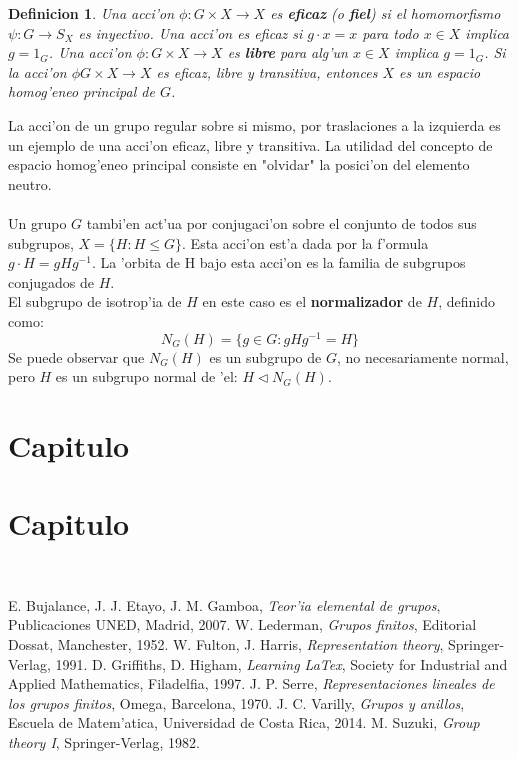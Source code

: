 \documentclass[a4paper,openright,12pt]{report}
\numberwithin{equation}{section} %
\newtheorem{definicion}{Definicion}[section] %
\begin{document}
\begin{definicion}
Una acci'on $\phi : G \times X \rightarrow X$ es \textbf{eficaz} (o \textbf{fiel}) si el homomorfismo $\psi : G \rightarrow S_{X}$ es inyectivo. Una acci'on es eficaz si $g \cdot x=x$ para todo $x \in X$ implica $g=1_{G}$. Una acci'on $\phi : G \times X \rightarrow X$ es \textbf{libre} para alg'un $x \in X$ implica $g=1_{G}$. Si la acci'on $\phi G \times X \rightarrow X$ es eficaz, libre y transitiva, entonces $X$ es un espacio homog'eneo principal de $G$.
\end{definicion}
La acci'on de un grupo regular sobre si mismo, por traslaciones a la izquierda es un ejemplo de una acci'on eficaz, libre y transitiva. La utilidad del concepto de espacio homog'eneo principal consiste en "olvidar" la posici'on del elemento neutro.\\
\\
Un grupo $G$ tambi'en act'ua por conjugaci'on sobre el conjunto de todos sus subgrupos, $X=\{H:H\leq G \}$. Esta acci'on est'a dada por la f'ormula $g \cdot H = gHg^{-1} $. La 'orbita de H bajo esta acci'on es la familia de subgrupos conjugados de $H$. \\
El subgrupo de isotrop'ia de $H$ en este caso es el \textbf{normalizador} de $H$, definido como:
\[
N_{G}(H)=\{g \in G : gHg^{-1}=H  \}
\]
Se puede observar que $N_{G}(H)$ es un subgrupo de $G$, no necesariamente normal, pero $H$ es un subgrupo normal de 'el: $H \triangleleft N_{G}(H)$.
\chapter{Capitulo}
\chapter{Capitulo}
\newpage
$\ $
\thispagestyle{empty}
\begin{thebibliography}{9}
 E. Bujalance, J. J. Etayo, J. M. Gamboa, \emph{Teor'ia elemental de grupos}, Publicaciones UNED, Madrid, 2007.
 W. Lederman, \emph{Grupos finitos}, Editorial Dossat, Manchester, 1952.
 W. Fulton, J. Harris, \emph{Representation theory}, Springer-Verlag, 1991.
 D. Griffiths, D. Higham, \emph{Learning LaTex}, Society for Industrial and Applied Mathematics, Filadelfia, 1997.
 J. P. Serre, \emph{Representaciones lineales de los grupos finitos}, Omega, Barcelona, 1970.
 J. C. Varilly, \emph{Grupos y anillos}, Escuela de Matem'atica, Universidad de Costa Rica, 2014. 
 M. Suzuki, \emph{Group theory I}, Springer-Verlag, 1982. 
\end{thebibliography}
\end{document}
